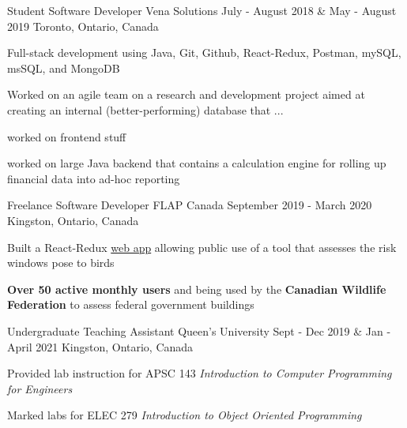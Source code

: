 \begin{cventries}
  \cventry
    {Student Software Developer} %
    {Vena Solutions} %
    {July - August 2018 \& May - August 2019} %
    {Toronto, Ontario, Canada} %
    {
      \begin{cvitems} %
        \item {Full-stack development using Java, Git, Github, React-Redux, Postman, mySQL, msSQL, and MongoDB}
        \item{Worked on an agile team on a research and development project aimed at creating an internal (better-performing) database that ...}
        \item{worked on frontend stuff}
        \item{worked on large Java backend that contains a calculation engine for rolling up financial data into ad-hoc reporting}
      \end{cvitems}
    }

  \cventry
    {Freelance Software Developer} %
    {FLAP Canada} %
    {September 2019 - March 2020} %
    {Kingston, Ontario, Canada} %
    {
      \begin{cvitems} %
        \item {Built a React-Redux \href{https://www.flapapp.ca/}{web app} allowing public use of a tool that assesses the risk windows pose to birds}
        \item{\textbf{Over 50 active monthly users} and being used by the \textbf{Canadian Wildlife Federation} to assess federal government buildings}
      \end{cvitems}
    }

  \cventry
    {Undergraduate Teaching Assistant} %
    {Queen's University} %
    {Sept - Dec 2019 \& Jan - April 2021} %
    {Kingston, Ontario, Canada} %
    {
      \begin{cvitems} %
        \item{Provided lab instruction for APSC 143 \textit{Introduction to Computer Programming for Engineers}}
        \item{Marked labs for ELEC 279 \textit{Introduction to Object Oriented Programming}}
      \end{cvitems}
    }


\end{cventries}
